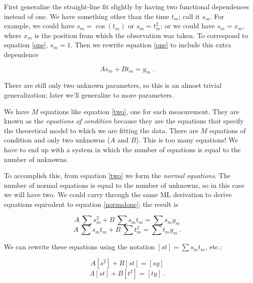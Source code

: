 \documentclass[psfig,preprint]{aastex}
\begin{document}
	First generalize the straight-line fit slightly by having two
functional dependences instead of one. We have something other than the
time $t_m$; call it $s_m$. For example, we could have $s_m = \cos (t_m)$
or $s_m = t_m^2$; or we could have $s_m = x_m$, where $x_m$ is the
position from which the observation was taken. To correspond to equation
\ref{one}, $s_m = 1$. Then we rewrite equation \ref{one} to include this
extra dependence

\begin{equation} \label{two}
A s_m + B t_m = y_m \; .
\end{equation}

\noindent There are still only two unknown parameters, so this is an
almost trivial generalization; later we'll generalize to more
parameters.

	We have $M$ equations like equation \ref{two}, one for each
measurement.  They are known as the {\it equations of condition} because
they are the equations that specify the theoretical model to which we
are fitting the data. There are $M$ equations of condition and only two
unknowns ($A$ and $B$).  This is too many equations! We have to end up
with a system in which the number of equations is equal to the number of
unknowns.

	To accomplish this, from equation \ref{two} we form the {\it
normal equations}.  The number of normal equations is equal to the
number of unknowns, so in this case we will have two.   We could carry
through the same ML derivation to derive equations equivalent to
equation \ref{normalone}; the result is

\begin{mathletters} \label{ones}
\begin{equation}
A\ \sum s_m^2 + B \ \sum s_m t_m = \sum s_m y_m
\end{equation}
\begin{equation}
A \ \sum s_m t_m + B \ \sum t_m^2  = \sum t_m y_m \ .
\end{equation}
\end{mathletters}

\noindent We can rewrite these equations using the notation $[st] =
\sum s_m t_m$, etc.:

\begin{mathletters} \label{normaltwo}
\begin{equation}
A [ s^2 ] + B [ s t ] = [ s y ]
\end{equation}
\begin{equation}
A [ s t ] + B [ t^2 ] = [ t y ] \ .
\end{equation}
\end{mathletters}
\end{document}
